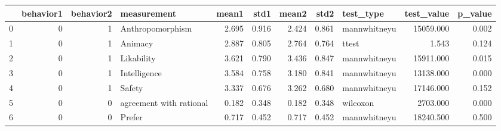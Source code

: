 \begin{tabular}{lrrlrrrrlrr}
\toprule
{} &  behavior1 &  behavior2 &              measurement &  mean1 &   std1 &  mean2 &   std2 &     test\_type &  test\_value &  p\_value \\
\midrule
0 &          0 &          1 &         Anthropomorphism &  2.695 &  0.916 &  2.424 &  0.861 &  mannwhitneyu &   15059.000 &    0.002 \\
1 &          0 &          1 &                  Animacy &  2.887 &  0.805 &  2.764 &  0.764 &         ttest &       1.543 &    0.124 \\
2 &          0 &          1 &               Likability &  3.621 &  0.790 &  3.436 &  0.847 &  mannwhitneyu &   15911.000 &    0.015 \\
3 &          0 &          1 &             Intelligence &  3.584 &  0.758 &  3.180 &  0.841 &  mannwhitneyu &   13138.000 &    0.000 \\
4 &          0 &          1 &                   Safety &  3.337 &  0.676 &  3.262 &  0.680 &  mannwhitneyu &   17146.000 &    0.152 \\
5 &          0 &          0 &  agreement with rational &  0.182 &  0.348 &  0.182 &  0.348 &      wilcoxon &    2703.000 &    0.000 \\
6 &          0 &          0 &                   Prefer &  0.717 &  0.452 &  0.717 &  0.452 &  mannwhitneyu &   18240.500 &    0.500 \\
\bottomrule
\end{tabular}
